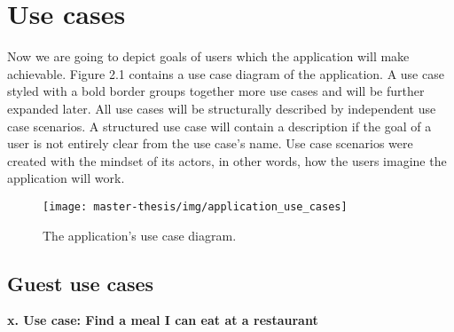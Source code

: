 \section{Use cases}
Now we are going to depict goals of users which the application will make achievable.
Figure 2.1 contains a use case diagram of the application.
A use case styled with a bold border groups together more use cases and will be further expanded later.
All use cases will be structurally described by independent use case scenarios.
A structured use case will contain a description if the goal of a user is not entirely clear from the use case's name.
Use case scenarios were created with the mindset of its actors, in other words, how the users imagine the application will work.

\begin{figure}[h]
  \texttt{[image: master-thesis/img/application\_use\_cases]}
  \caption{The application's use case diagram.}
\end{figure}

\vspace*{\fill}

\def\arraystretch{1.5}

\subsection{Guest use cases}

\textbf{x. Use case: Find a meal I can eat at a restaurant}

